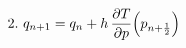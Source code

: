 \documentclass[preview]{standalone}
\begin{document}
\begin{align*}
\special{dvisvgm:raw <g id='unique000'>}2.\ q_{n+1} = q_n + h\,\frac{\partial T}{\partial p}\!\left(p_{n+\frac{1}{2}}\right)\special{dvisvgm:raw </g>}
\end{align*}
\end{document}
